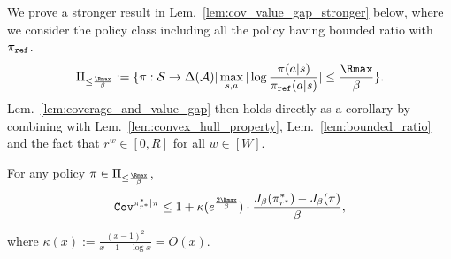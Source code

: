 \LemCovValGap*
We prove a stronger result in Lem.~\ref{lem:cov_value_gap_stronger} below, where we consider the policy class including all the policy having bounded ratio with $\pi_{\texttt{ref}}$.
\begin{align*}
    \Pi_{\leq\frac{\Rmax}{\beta}} := \{\pi:\cS\rightarrow\Delta(\cA)| \max_{s,a} |\log\frac{\pi(a|s)}{\pi_\textref(a|s)}| \leq \frac{\Rmax}{\beta}\}.
\end{align*}
Lem.~\ref{lem:coverage_and_value_gap} then holds directly as a corollary by combining with Lem.~\ref{lem:convex_hull_property}, Lem.~\ref{lem:bounded_ratio} and the fact that $r^w \in [0, R]$ for all $w\in[W]$.
\begin{lemma}\label{lem:cov_value_gap_stronger}
    For any policy $\pi \in \Pi_{\leq\frac{\Rmax}{\beta}}$,
    \begin{align}
        \cov^{\pi^*_{r^*}|{\pi}} \leq 1 + \kappa(e^{\frac{2{\Rmax}}{\beta}}) \cdot \frac{J_\beta(\pi^*_{r^*}) - J_\beta({\pi})}{\beta},
    \end{align}
    where $\kappa(x) := \frac{(x-1)^2}{x-1- \log x} = O(x)$.
\end{lemma}
